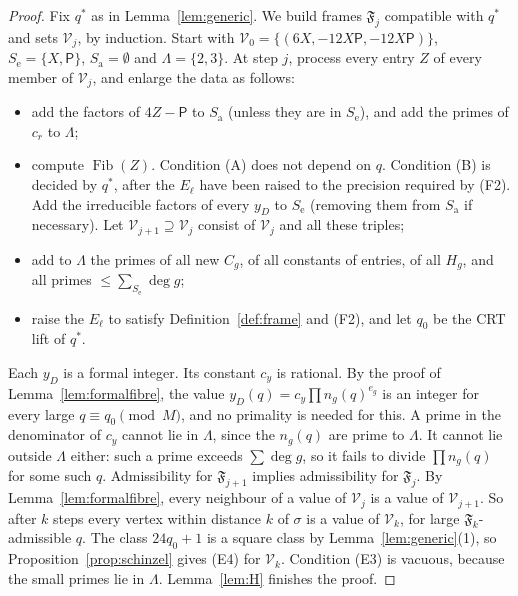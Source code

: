 \documentclass[11pt,reqno]{amsart}
\theoremstyle{definition}
\newcommand{\Pp}{\mathsf P}
\newcommand{\cV}{\mathcal V}
\newcommand{\cF}{\mathfrak F}
\newcommand{\Se}{S_{\mathrm e}}
\newcommand{\Sa}{S_{\mathrm a}}
\newcommand{\Fib}{\operatorname{Fib}}
\begin{document}
\begin{proof}
Fix $q^*$ as in Lemma~\ref{lem:generic}.  We build frames $\cF_j$
compatible with $q^*$ and sets $\cV_j$, by induction.  Start with
$\cV_0=\{(6X,-12X\Pp,-12X\Pp)\}$, $\Se=\{X,\Pp\}$, $\Sa=\emptyset$ and
$\Lambda=\{2,3\}$.  At step $j$, process every entry $Z$ of every member of
$\cV_j$, and enlarge the data as follows:
\begin{itemize}
\item add the factors of $4Z-\Pp$ to $\Sa$ (unless they are in $\Se$), and
add the primes of $c_r$ to $\Lambda$;
\item compute $\Fib(Z)$.  Condition (A) does not depend on $q$.  Condition (B)
is decided by $q^*$, after the $E_\ell$ have been raised to the precision
required by (F2).  Add the irreducible factors of every $y_D$ to $\Se$
(removing them from $\Sa$ if necessary).  Let $\cV_{j+1}\supseteq\cV_j$
consist of $\cV_j$ and all these triples;
\item add to $\Lambda$ the primes of all new $C_g$, of all constants of
entries, of all $H_g$, and all primes $\le\sum_{\Se}\deg g$;
\item raise the $E_\ell$ to satisfy Definition~\ref{def:frame} and (F2),
and let $q_0$ be the CRT lift of $q^*$.
\end{itemize}
Each $y_D$ is a formal integer.  Its constant $c_y$ is rational.  By the
proof of Lemma~\ref{lem:formalfibre}, the value $y_D(q)=c_y\prod n_g(q)^{e_g}$
is an integer for every large $q\equiv q_0\pmod M$, and no primality is
needed for this.  A prime in the denominator of $c_y$ cannot lie in
$\Lambda$, since the $n_g(q)$ are prime to $\Lambda$.  It cannot lie outside
$\Lambda$ either: such a prime exceeds $\sum\deg g$, so it fails to
divide $\prod n_g(q)$ for some such $q$.  Admissibility
for $\cF_{j+1}$ implies admissibility for $\cF_j$.  By
Lemma~\ref{lem:formalfibre}, every neighbour of a value of $\cV_j$ is a
value of $\cV_{j+1}$.  So after $k$ steps every vertex within distance $k$
of $\sigma$ is a value of $\cV_k$, for large $\cF_k$-admissible $q$.  The
class $24q_0+1$ is a square class by Lemma~\ref{lem:generic}(1), so
Proposition~\ref{prop:schinzel} gives (E4) for $\cV_k$.  Condition (E3)
is vacuous, because the small primes lie in $\Lambda$.  Lemma~\ref{lem:H}
finishes the proof.
\end{proof}
\end{document}
